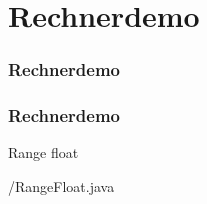 \def\stitle{Rechnerdemo}
\section{\stitle}
\begin{frame}
\frametitle{\stitle}%
\tableofcontents[current]%
\end{frame}

\begin{frame}[fragile]%
  \frametitle{\stitle}%
\medskip

Range float

{\getexercisefolder/RangeFloat.java}
\end{frame}
